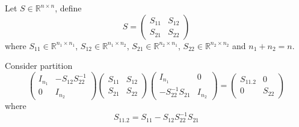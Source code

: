 \documentclass[12pt]{book}
\theoremstyle{definition}
\theoremstyle{remark}
\begin{document}
\begin{notionbox}[Note]
Let \( S \in \mathbb{R}^{n \times n} \), define
\[
S =
\begin{pmatrix}
S_{11} & S_{12} \\
S_{21} & S_{22}
\end{pmatrix}
\]
where \( S_{11} \in \mathbb{R}^{n_1 \times n_1} \), \( S_{12} \in \mathbb{R}^{n_1 \times n_2} \), \( S_{21} \in \mathbb{R}^{n_2 \times n_1} \), \( S_{22} \in \mathbb{R}^{n_2 \times n_2} \) and \( n_1 + n_2 = n \).

Consider partition
\[
\begin{pmatrix}
I_{n_1} & -S_{12} S_{22}^{-1} \\
0 & I_{n_2}
\end{pmatrix}
\begin{pmatrix}
S_{11} & S_{12} \\
S_{21} & S_{22}
\end{pmatrix}
\begin{pmatrix}
I_{n_1} & 0 \\
-S_{22}^{-1} S_{21} & I_{n_2}
\end{pmatrix}
=
\begin{pmatrix}
S_{11.2} & 0 \\
0 & S_{22}
\end{pmatrix}
\]
where
\[
S_{11.2} = S_{11} - S_{12} S_{22}^{-1} S_{21}
\]
\end{notionbox}
\end{document}
